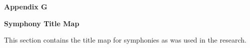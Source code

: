 %
%
%                 

\textbf{\Huge Appendix G}
\bigskip

\textbf{\LARGE Symphony Title Map}

\bigskip
This section contains the title map for symphonies as was used in the research.

